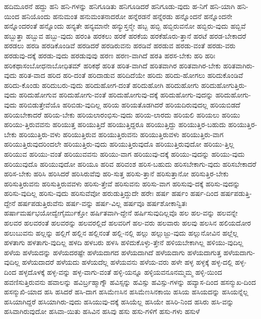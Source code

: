 {ಹದಿಮೂರನೆ
ಹದ್ದು
ಹನಿ
ಹನಿ-ಗಳನ್ನು
ಹನಿಗೂಡಿತು
ಹನಿಗೂಡಿದರೆ
ಹನಿಗೂಡು-ವುದು
ಹ-ನಿಗೆ
ಹನಿ-ಯಾಗಿ
ಹನಿ-ಯಿಂದ
ಹನಿಯೊಂದು
ಹನುಮಂತ
ಹನುಮಂತನಾದರೋ
ಹನ್ನೆರಡನೆ
ಹನ್ನೆರಡು
ಹನ್ನೊಂದನೆ
ಹನ್ನೊಂದನೇ
ಹನ್ನೊಂದರಂತೆ
ಹನ್ನೊಂದು
ಹನ್ಯತೇ
ಹನ್ಯಮಾನೇ
ಹನ್ಯುಸ್ತನ್ಮೇ
ಹಬ್ಬ
ಹಬ್ಬಿ
ಹಬ್ಬಿರುವನೋ
ಹಬ್ಬಿರು-ವುದು
ಹಬ್ಬಿವೆ
ಹಬ್ಬುತ್ತಾ
ಹಬ್ಬುವ
ಹಬ್ಬು-ವುದು
ಹರಂತಿ
ಹರಕಲು
ಹರಕೆ
ಹರಕೆಯ
ಹರಕೆಹೊರು-ತ್ತಾನೆ
ಹರಟೆ
ಹರಡ-ಬೇಕಾದರೆ
ಹರಡಲು
ಹರಡಿ
ಹರಡಿಕೊಂಡಿವೆ
ಹರಡಿದರೆ
ಹರಡಿರುವನು
ಹರಡಿವೆ
ಹರಡುವ
ಹರಡು-ವಂತೆ
ಹರಡು-ವರು
ಹರಡುವು-ದಕ್ಕೆ
ಹರಡು-ವುದು
ಹರಡುವುವು
ಹರಣ
ಹರಣ-ವಾಗಿದೆ
ಹರತಿ
ಹರಸ-ಬೇಕು
ಹರಿ
ಹರಿಃ
ಹರಿಕಥಾಸಂಬೋಧನಾಬೋಧಿತಮ್
ಹರಿಕಥೆ
ಹರಿತ
ಹರಿತ-ವಾಗಿದೆ
ಹರಿತವಾಗಿರ
ಹರಿತವಾಗಿರ-ಬೇಕು
ಹರಿತವಾಗಿರು-ವುದು
ಹರಿತ-ವಾದ
ಹರಿದ
ಹರಿ-ದಂತೆ
ಹರಿದಾಡುವ
ಹರಿದಿದೆಯೇ
ಹರಿದು
ಹರಿದು-ಹೋಗಲು
ಹರಿದುಕೊಂಡಿವೆ
ಹರಿದು-ಕೊಂಡು
ಹರಿದುಬರು-ವುದು
ಹರಿದುಹೋಗ-ದಂತೆ
ಹರಿದುಹೋಗಿ
ಹರಿದುಹೋಗು
ಹರಿದುಹೋಗುತ್ತಿರು-ವುದು
ಹರಿದುಹೋಗುವ
ಹರಿದುಹೋಗು-ವಂತೆ
ಹರಿದುಹೋಗುವು-ದಕ್ಕೆ
ಹರಿದುಹೋಗು-ವುದನ್ನು
ಹರಿದುಹೋಗು-ವುದು
ಹರಿಬಿಡುತ್ತೇವೆಯೊ
ಹರಿಬಿಡು-ವುದಿಲ್ಲ
ಹರಿಯ
ಹರಿಯತೊಡಗಿದರೆ
ಹರಿಯದಿರುವುದಲ್ಲ
ಹರಿಯಬಿಡದೆ
ಹರಿಯಬೇಕಾದರೆ
ಹರಿಯ-ಬೇಕು
ಹರಿಯಲಾರಂಭಿಸು-ವುದು
ಹರಿಯ-ಲಾರದು
ಹರಿಯಲಿ
ಹರಿಯಲು
ಹರಿಯು
ಹರಿಯು-ತ್ತಿರುವವನು
ಹರಿಯುತ್ತ
ಹರಿಯುತ್ತಿದೆ
ಹರಿಯುತ್ತಿದ್ದರೂ
ಹರಿಯುತ್ತಿದ್ದು
ಹರಿಯುತ್ತಿರ-ಬಹುದು
ಹರಿಯುತ್ತಿರ-ಬೇಕು
ಹರಿಯುತ್ತಿರು-ವಳು
ಹರಿಯುತ್ತಿರುವ
ಹರಿಯುತ್ತಿರುವನು
ಹರಿಯುತ್ತಿರುವಳು
ಹರಿಯುತ್ತಿರು-ವಾಗ
ಹರಿಯುತ್ತಿರುವುದರಿಂದಲೇ
ಹರಿಯುತ್ತಿರು-ವುದು
ಹರಿಯುತ್ತಿರುವುದೊ
ಹರಿಯುತ್ತಿರುವುದೋ
ಹರಿಯು-ತ್ತಿಲ್ಲ
ಹರಿಯುವ
ಹರಿಯು-ವಂತೆ
ಹರಿಯುವವನು
ಹರಿಯು-ವಾಗ
ಹರಿಯುವು-ದಕ್ಕೆ
ಹರಿಯು-ವುದನ್ನು
ಹರಿಯು-ವುದು
ಹರಿಯುವುದೊ
ಹರಿಯುವುದೋ
ಹರಿಯೂ
ಹರಿವ
ಹರಿವಂಶ
ಹರಿಸ-ಬಹುದು
ಹರಿಸಬೇಕಾಗು-ವುದು
ಹರಿಸಬೇಕಾದರೆ
ಹರಿಸ-ಬೇಕು
ಹರಿಸಿ
ಹರಿಸಿದರೆ
ಹರಿಸಿರುವೆವು
ಹರಿ-ಸುತ್ತ
ಹರಿಸು-ತ್ತಾನೆ
ಹರಿಸುತ್ತಾನೋ
ಹರಿಸುತ್ತಿರ-ಬೇಕು
ಹರಿಸುತ್ತಿರುವನು
ಹರಿಸುತ್ತಿರುವವಳು
ಹರಿಸು-ತ್ತೇವೆ
ಹರಿಸುವನು
ಹರಿಸು-ವಾಗ
ಹರಿಸುವು-ದಕ್ಕೆ
ಹರಿಸು-ವುದನ್ನು
ಹರಿಸು-ವುದಿಲ್ಲ
ಹರಿಸು-ವುದು
ಹರಿಸುವೆವೋ
ಹರುಡುತ್ತಿದ್ದುದೇ
ಹರೇಃ
ಹರ್ಷ
ಹರ್ಷಂ
ಹರ್ಷ-ದಿಂದ
ಹರ್ಷಪಡುತ್ತಿ-ದ್ದೇನೆ
ಹರ್ಷಪಡುತ್ತಿರುವೆನು
ಹರ್ಷ-ವನ್ನು
ಹರ್ಷ-ವಿಲ್ಲ
ಹರ್ಷವೂ
ಹರ್ಷಶೋಕಾನ್ವಿತಃ
ಹರ್ಷಾಮರ್ಷಭಯೋದ್ವೇಗೈರ್ಮುಕ್ತೋ
ಹರ್ಷಿತವಾಗಿ-ದ್ದೇನೆ
ಹರ್ಷಿಸುವುದಿಲ್ಲವೊ
ಹಲ
ಹಲ-ವನ್ನು
ಹಲವನ್ನೇ
ಹಲವರ
ಹಲವರಂತೆ
ಹಲವರನ್ನು
ಹಲವರಲ್ಲಿದೆ
ಹಲವರಿಗೆ
ಹಲ-ವರು
ಹಲವಾರು
ಹಲವು
ಹಲಸಿನ
ಹಲಿಯದೋರ
ಹಲುಬುವನು
ಹಲ್ಲನ್ನು
ಹಲ್ಲಿಗೆ
ಹಲ್ಲಿನ
ಹಲ್ಲಿನಂತೆ
ಹಲ್ಲಿ-ನಲ್ಲಿ
ಹಲ್ಲು
ಹಲ್ಲುಜ್ಜು-ವುದು
ಹಲ್ಲುನೋವಿನ
ಹಲ್ಲೆಲ್ಲ
ಹಳತಾಗು
ಹಳತಾಗು-ವುದಿಲ್ಲ
ಹಳದಿ
ಹಳಬರು
ಹಳಸಿ
ಹಳಿದುಕೊಳ್ಳು-ತ್ತೇನೆ
ಹಳಿಯಬೇಕಾಗಿಲ್ಲ
ಹಳಿಯು-ವುದಿಲ್ಲ
ಹಳೆಯ
ಹಳೆಯದನ್ನು
ಹಳೆಯದರಷ್ಟೇ
ಹಳೆಯದಾಗದ
ಹಳೆಯದಾಗಿದೆ
ಹಳೆಯದಾಗು
ಹಳೆಯದಾಗುತ್ತ
ಹಳೆಯದಾಗು-ವುದಿಲ್ಲ
ಹಳೆಯದಾದರೆ
ಹಳೆಯದು
ಹಳೆಯದೆಲ್ಲ
ಹಳೆಯವನು
ಹಳೆಯ-ವರು
ಹಳೇ
ಹಳ್ಳ
ಹಳ್ಳಕ್ಕೆ
ಹಳ್ಳ-ದಲ್ಲಿ
ಹಳ್ಳ-ದಿಂದ
ಹಳ್ಳದೊಳಕ್ಕೆ
ಹಳ್ಳ-ವನ್ನು
ಹಳ್ಳ-ವಾಗು-ವಂತೆ
ಹಳ್ಳಿ-ಯನ್ನೂ
ಹಳ್ಳಿಯವನೂನಮ್ಮಮ್ಮ
ಹಳ್ಳಿ-ಯಿಂದ
ಹವಣಿಸುತ್ತಿರುವನು
ಹವಾಲನ್ನು
ಹವಿರ್ಬ್ರಹ್ಮಾಗ್ನೌ
ಹವಿಸ್ಸನ್ನು
ಹವಿಸ್ಸು
ಹವಿಸ್ಸು-ಗಳನ್ನು
ಹವ್ಯಾಸ-ದಿಂದ
ಹಸನ್ಮುಖ-ದಿಂದ
ಹಸನ್ಮುಖಿ-ಯಾದ
ಹಸಿ
ಹಸಿದರೆ
ಹಸಿ-ದಾಗ
ಹಸಿಮೆಣಸಿನ
ಹಸಿಮೆಣಸಿನಕಾಯಿ
ಹಸಿಯ
ಹಸಿಯದನ್ನು
ಹಸಿಯನ್ನೆಲ್ಲ
ಹಸಿಯಾಗಿದ್ದರೆ
ಹಸಿಯಾಗಿರು-ವುದು
ಹಸಿಯುವು-ದಕ್ಕೆ
ಹಸಿಯೆಲ್ಲ
ಹಸಿಯೇ
ಹಸಿರಿ-ನಿಂದ
ಹಸಿರು
ಹಸಿ-ವನ್ನು
ಹಸಿವಾಗಿರುವುದೋ
ಹಸಿವಾ-ಯಿತು
ಹಸಿವಿನ
ಹಸಿವು
ಹಸು
ಹಸು-ಗಳಿಗೆ
ಹಸು-ಗಳು
ಹಸುಳೆ
}
